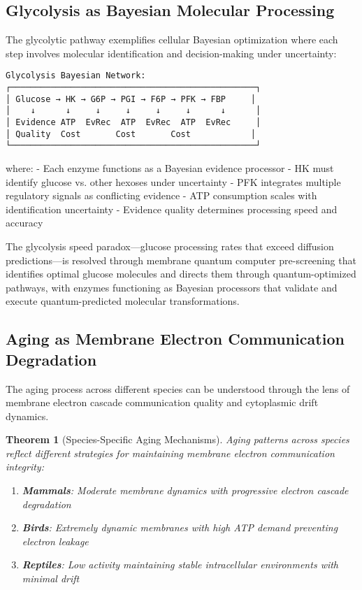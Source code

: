 \documentclass[12pt,a4paper]{article}
\newtheorem{theorem}{Theorem}[section]
\begin{document}
\subsection{Glycolysis as Bayesian Molecular Processing}

The glycolytic pathway exemplifies cellular Bayesian optimization where each step involves molecular identification and decision-making under uncertainty:

\begin{verbatim}
Glycolysis Bayesian Network:
┌─────────────────────────────────────────────────┐
│ Glucose → HK → G6P → PGI → F6P → PFK → FBP     │
│    ↓      ↓     ↓     ↓     ↓     ↓      ↓      │
│ Evidence ATP  EvRec  ATP  EvRec  ATP  EvRec     │
│ Quality  Cost       Cost       Cost            │
└─────────────────────────────────────────────────┘
\end{verbatim}

where:
- Each enzyme functions as a Bayesian evidence processor
- HK must identify glucose vs. other hexoses under uncertainty  
- PFK integrates multiple regulatory signals as conflicting evidence
- ATP consumption scales with identification uncertainty
- Evidence quality determines processing speed and accuracy

The glycolysis speed paradox—glucose processing rates that exceed diffusion predictions—is resolved through membrane quantum computer pre-screening that identifies optimal glucose molecules and directs them through quantum-optimized pathways, with enzymes functioning as Bayesian processors that validate and execute quantum-predicted molecular transformations.

\subsection{Aging as Membrane Electron Communication Degradation}

The aging process across different species can be understood through the lens of membrane electron cascade communication quality and cytoplasmic drift dynamics.

\begin{theorem}[Species-Specific Aging Mechanisms]
Aging patterns across species reflect different strategies for maintaining membrane electron communication integrity:
\begin{enumerate}
\item \textbf{Mammals}: Moderate membrane dynamics with progressive electron cascade degradation
\item \textbf{Birds}: Extremely dynamic membranes with high ATP demand preventing electron leakage
\item \textbf{Reptiles}: Low activity maintaining stable intracellular environments with minimal drift
\end{enumerate}
\end{theorem}
\end{document}
